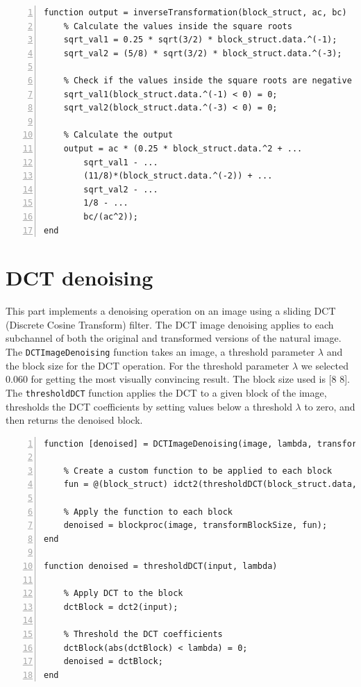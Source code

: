 \documentclass[12pt,a4paper,english
]{tunithesis}
\begin{document}
\begin{lstlisting}[style=Matlab-editor, numbers=left, basicstyle=\small]
% % 9. Inverse transformation
function output = inverseTransformation(block_struct, ac, bc)
    % Calculate the values inside the square roots
    sqrt_val1 = 0.25 * sqrt(3/2) * block_struct.data.^(-1);
    sqrt_val2 = (5/8) * sqrt(3/2) * block_struct.data.^(-3);

    % Check if the values inside the square roots are negative
    sqrt_val1(block_struct.data.^(-1) < 0) = 0;
    sqrt_val2(block_struct.data.^(-3) < 0) = 0;

    % Calculate the output
    output = ac * (0.25 * block_struct.data.^2 + ...
        sqrt_val1 - ...
        (11/8)*(block_struct.data.^(-2)) + ...
        sqrt_val2 - ...
        1/8 - ...
        bc/(ac^2));
end
\end{lstlisting}

\section{DCT denoising}
This part implements a denoising operation on an image using a sliding DCT (Discrete Cosine Transform) filter. The DCT image denoising applies to each subchannel of both the original and transformed versions of the natural image. The \texttt{DCTImageDenoising} function takes an image, a threshold parameter $\lambda$ and the block size for the DCT operation. For the threshold parameter $\lambda$ we selected 0.060 for getting the most visually convincing result. The block size used is [8 8]. The \texttt{thresholdDCT} function applies the DCT to a given block of the image, thresholds the DCT coefficients by setting values below a threshold $\lambda$ to zero, and then returns the denoised block.

\begin{lstlisting}[style=Matlab-editor, numbers=left, basicstyle=\small]
function [denoised] = DCTImageDenoising(image, lambda, transformBlockSize)

    % Create a custom function to be applied to each block
    fun = @(block_struct) idct2(thresholdDCT(block_struct.data, lambda));

    % Apply the function to each block
    denoised = blockproc(image, transformBlockSize, fun);
end

function denoised = thresholdDCT(input, lambda)

    % Apply DCT to the block
    dctBlock = dct2(input);

    % Threshold the DCT coefficients
    dctBlock(abs(dctBlock) < lambda) = 0;
    denoised = dctBlock;
end
\end{lstlisting}
\end{document}
